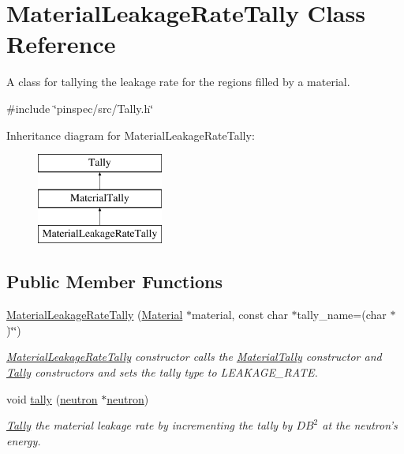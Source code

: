 \hypertarget{classMaterialLeakageRateTally}{\section{Material\-Leakage\-Rate\-Tally Class Reference}
\label{classMaterialLeakageRateTally}
}


A class for tallying the leakage rate for the regions filled by a material.  




{\ttfamily \#include \char`\"{}pinspec/src/\-Tally.\-h\char`\"{}}

Inheritance diagram for Material\-Leakage\-Rate\-Tally\-:\begin{figure}[H]
\begin{center}
\leavevmode
\includegraphics[height=3.000000cm]{classMaterialLeakageRateTally}
\end{center}
\end{figure}
\subsection*{Public Member Functions}
\begin{DoxyCompactItemize}
\item 
\hyperlink{classMaterialLeakageRateTally_af2523d4d3495400bcb0cc94951f4bb43}{Material\-Leakage\-Rate\-Tally} (\hyperlink{classMaterial}{Material} $\ast$material, const char $\ast$tally\-\_\-name=(char $\ast$)\char`\"{}\char`\"{})
\begin{DoxyCompactList}\small\item\em \hyperlink{classMaterialLeakageRateTally}{Material\-Leakage\-Rate\-Tally} constructor calls the \hyperlink{classMaterialTally}{Material\-Tally} constructor and \hyperlink{classTally}{Tally} constructors and sets the tally type to L\-E\-A\-K\-A\-G\-E\-\_\-\-R\-A\-T\-E. \end{DoxyCompactList}\item 
void \hyperlink{classMaterialLeakageRateTally_ad23d9da8c90ce281205d70c3b3132cc3}{tally} (\hyperlink{structneutron}{neutron} $\ast$\hyperlink{structneutron}{neutron})
\begin{DoxyCompactList}\small\item\em \hyperlink{classTally}{Tally} the material leakage rate by incrementing the tally by $ DB^2 $ at the neutron's energy. \end{DoxyCompactList}\end{DoxyCompactItemize}
